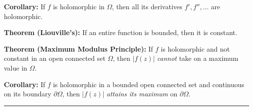 \documentclass[10pt,landscape]{article}
\begin{document}
\begin{multicols}{3}
\textbf{Corollary:} If $f$ is holomorphic in $\Omega$, then all its derivatives $f',f'', \ldots $ are holomorphic.

\textbf{Theorem (Liouville's):} If an entire function is bounded, then it
is constant.

\textbf{Theorem (Maximum Modulus Principle):}  If $f$ is holomorphic and not
constant in an open connected set $\Omega$, then $|f(z)|$ \textit{cannot} take on a maximum value in $\Omega$.

\textbf{Corollary:} If $f$ is holomorphic in a bounded open connected set and
continuous on its boundary $\partial \Omega$, then $|f(z)|$ \textit{attains its maximum} on $\partial \Omega$.



\rule{0.3\linewidth}{0.25pt}
\scriptsize


\end{multicols}
\end{document}
